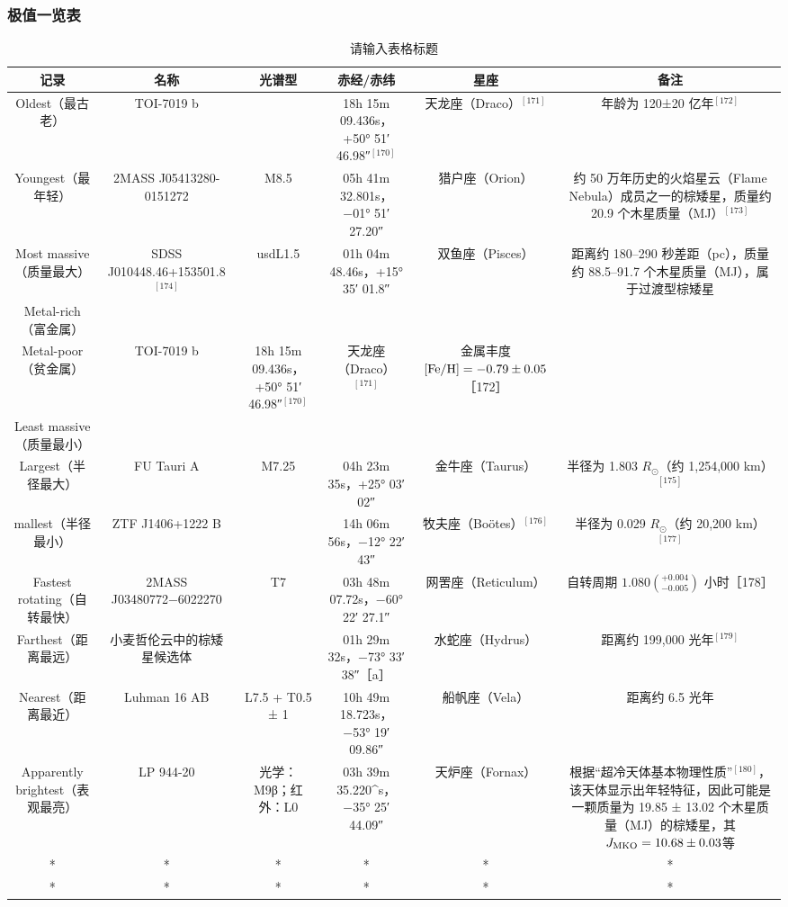 \subsubsection{极值一览表}
\begin{table}[ht]
\centering
\caption{请输入表格标题}\label{tab_Brdw2}
\begin{tabular}{|c|c|c|c|c|c|}
\hline
\textbf{记录} & \textbf{名称} & \textbf{光谱型} & \textbf{赤经/赤纬} & \textbf{星座} &\textbf{备注} \\
\hline
Oldest（最古老） & TOI-7019 b  &  &  18h 15m 09.436s，+50° 51′ 46.98″$^{[170]}$ & 天龙座（Draco）$^{[171]}$ & 年龄为 120±20 亿年$^{[172]}$\\
\hline
Youngest（最年轻） & 2MASS J05413280-0151272  & M8.5  & 05h 41m 32.801s，−01° 51′ 27.20″ & 猎户座（Orion） & 约 50 万年历史的火焰星云（Flame Nebula）成员之一的棕矮星，质量约 20.9 个木星质量（MJ）$^{[173]}$\\
\hline
Most massive（质量最大） & SDSS J010448.46+153501.8 $^{[174]}$ &usdL1.5 & 01h 04m 48.46s，+15° 35′ 01.8″  & 双鱼座（Pisces） & 距离约 180–290 秒差距（pc），质量约 88.5–91.7 个木星质量（MJ），属于过渡型棕矮星\\
\hline
Metal-rich（富金属） &   &   &   &   & \\
\hline
Metal-poor（贫金属） & TOI-7019 b  & 18h 15m 09.436s，+50° 51′ 46.98″$^{[170]}$& 天龙座（Draco）$^{[171]}$ & 金属丰度$[{\rm Fe/H}] = -0.79 \pm 0.05$［172］\\
\hline
Least massive（质量最小）&   &   &   &   & \\
\hline
Largest（半径最大） & FU Tauri A  & M7.25 & 04h 23m 35s，+25° 03′ 02″  & 金牛座（Taurus） & 半径为 1.803 $R_\odot$（约 1,254,000 km）$^{[175]}$\\
\hline
mallest（半径最小） & ZTF J1406+1222 B &  & 14h 06m 56s，−12° 22′ 43″  & 牧夫座（Boötes）$^{[176]}$ & 半径为 0.029 $R_\odot$（约 20,200 km）$^{[177]}$\\
\hline
Fastest rotating（自转最快） & 2MASS J03480772−6022270  & T7 &03h 48m 07.72s，−60° 22′ 27.1″  & 网罟座（Reticulum） & 自转周期 $1.080(^{+0.004}_{-0.005})$ 小时［178］\\
\hline
Farthest（距离最远） & 小麦哲伦云中的棕矮星候选体 &   & 01h 29m 32s，−73° 33′ 38″［a］ & 水蛇座（Hydrus） & 距离约 199,000 光年$^{[179]}$\\
\hline
Nearest（距离最近） & Luhman 16 AB  & L7.5 + T0.5 ± 1 & 10h 49m 18.723s，−53° 19′ 09.86″ & 船帆座（Vela） & 距离约 6.5 光年\\
\hline
Apparently brightest（表观最亮） & LP 944-20 & 光学：M9β；红外：L0 & 03h 39m 35.220^s，−35° 25′ 44.09″& 天炉座（Fornax） & 根据“超冷天体基本物理性质”$^{[180]}$，该天体显示出年轻特征，因此可能是一颗质量为 19.85 ± 13.02 个木星质量（MJ）的棕矮星，其 $J_{\rm MKO} = 10.68 \pm 0.03$等\\

\hline
* & * & * & * & * & * \\
\hline
* & * & * & * & * & * \\
\hline
\end{tabular}
\end{table}
